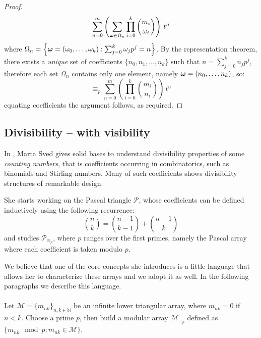\begin{proof}
\begin{displaymath}
        \sum_{n=0}^{m}{\left(\sum_{\boldsymbol{\omega}\in\Omega_{n}}{\prod_{i=0}^{k}{{{m_{i}}\choose{\omega_{i}}}}}\right)\,t^{n}}
    \end{displaymath}
    where $\Omega_{n}=\left\lbrace\boldsymbol{\omega}=\left(\omega_{0},\ldots,\omega_{k}\right):
        \sum_{j=0}^{k}{\omega_{j}p^{j}}=n\right\rbrace$.
    By the representation theorem, there exists a \emph{unique} set of coefficients
    $\lbrace n_{0},n_{1},\ldots,n_{k}\rbrace$ such that $n=\sum_{j=0}^{k}{n_{j}p^{j}}$, therefore
    each set $\Omega_{n}$ contains only one element, namely $\boldsymbol{\omega}=(n_{0},\ldots,n_{k})$, so:
    \begin{displaymath}
        \equiv_{p} \sum_{n=0}^{m}{\left({\prod_{i=0}^{k}{{{m_{i}}\choose{n_{i}}}}}\right)\,t^{n}}
    \end{displaymath}
    equating coefficients the argument follows, as required.

\end{proof}


\subsection{Divisibility -- with visibility}

In \cite{sved:1988}, Marta Sved gives solid bases to understand
divisibility properties of some \emph{counting numbers}, that is coefficients
occurring in combinatorics, such as binomials and Stirling numbers. Many of
such coefficients shows divisibility structures of remarkable design. 

She starts working on the Pascal triangle $\mathcal{P}$, whose coefficients
can be defined inductively using the following recurrence: 
\begin{equation}
    {{n}\choose{k}}={{n-1}\choose{k-1}}+{{n-1}\choose{k}}
    \label{eq:binomial:recurrence}
\end{equation}
and studies $\mathcal{P}_{\equiv_{p}}$, where $p$ ranges over the first primes, 
namely the Pascal array where each coefficient is taken modulo $p$.

We believe that one of the core concepts she introduces is a little language
that allows her to characterize these arrays and we adopt it 
as well. In the following paragraphs we describe this language. 
\\\\
Let $\mathcal{M}=\lbrace m_{nk}\rbrace_{n,k\in\mathbb{N}}$ 
be an infinite lower triangular array, where $m_{nk}=0$ if 
$n<k$. Choose a prime $p$, then build a modular array
$\mathcal{M}_{\equiv_{p}}$ defined as 
$\lbrace m_{nk}\mod p : m_{nk} \in \mathcal{M}\rbrace$.


